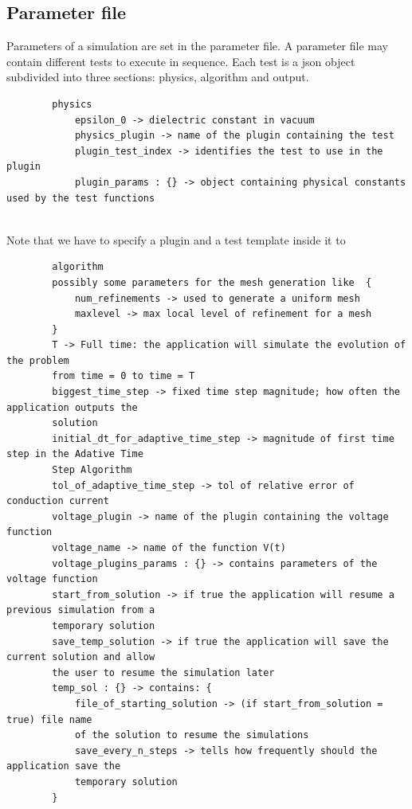 \documentclass[11pt,a4paper]{article}
\begin{document}
\subsection{Parameter file}
Parameters of a simulation are set in the parameter file. A parameter file may contain different tests to execute in sequence. Each test is a json object subdivided into three sections: physics, algorithm and output.\\
\begin{minipage}{\textwidth}
	\vspace{3mm}
	\small
	\begin{verbatim}
		physics
		    epsilon_0 -> dielectric constant in vacuum
		    physics_plugin -> name of the plugin containing the test
		    plugin_test_index -> identifies the test to use in the plugin
		    plugin_params : {} -> object containing physical constants used by the test functions
	\end{verbatim}
	\vspace*{0mm}
\end{minipage}\\
Note that we have to specify a plugin and a test template inside it to 
\begin{minipage}{\textwidth}
	\vspace{3mm}
	\small
	\begin{verbatim}
		algorithm
		possibly some parameters for the mesh generation like  {
			num_refinements -> used to generate a uniform mesh
			maxlevel -> max local level of refinement for a mesh
		}
		T -> Full time: the application will simulate the evolution of the problem
		from time = 0 to time = T
		biggest_time_step -> fixed time step magnitude; how often the application outputs the
		solution
		initial_dt_for_adaptive_time_step -> magnitude of first time step in the Adative Time
		Step Algorithm
		tol_of_adaptive_time_step -> tol of relative error of conduction current
		voltage_plugin -> name of the plugin containing the voltage function
		voltage_name -> name of the function V(t)
		voltage_plugins_params : {} -> contains parameters of the voltage function
		start_from_solution -> if true the application will resume a previous simulation from a
		temporary solution
		save_temp_solution -> if true the application will save the current solution and allow
		the user to resume the simulation later
		temp_sol : {} -> contains: {
			file_of_starting_solution -> (if start_from_solution = true) file name
			of the solution to resume the simulations
			save_every_n_steps -> tells how frequently should the application save the
			temporary solution
		}
	\end{verbatim}
\end{minipage}\\
\end{document}
